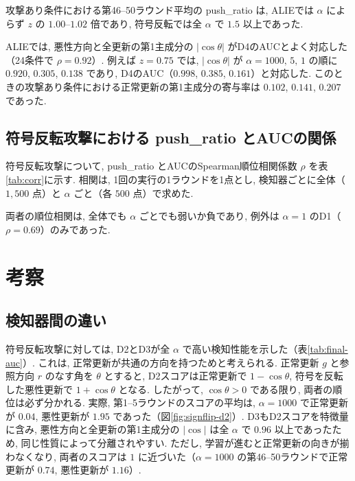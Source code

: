 \documentclass[a4j, dvipdfmx]{jsarticle}
\newcommand{\PushRatio}{\textrm{push\_ratio}}
\begin{document}
攻撃あり条件における第46--50ラウンド平均の \PushRatio{} は, ALIEでは $\alpha$ によらず $z$ の $1.00$--$1.02$ 倍であり, 符号反転では全 $\alpha$ で $1.5$ 以上であった.

ALIEでは, 悪性方向と全更新の第1主成分の $|\cos\theta|$ がD4のAUCとよく対応した（24条件で $\rho=0.92$）. 例えば $z=0.75$ では, $|\cos\theta|$ が $\alpha=1000,\,5,\,1$ の順に $0.920$, $0.305$, $0.138$ であり, D4のAUC（$0.998$, $0.385$, $0.161$）と対応した. このときの攻撃あり条件における正常更新の第1主成分の寄与率は $0.102$, $0.141$, $0.207$ であった.

\subsection{符号反転攻撃における \PushRatio{} とAUCの関係}
\label{sec:res-pushratio}

符号反転攻撃について, \PushRatio{} とAUCのSpearman順位相関係数 $\rho$ を表\ref{tab:corr}に示す. 相関は, 1回の実行の1ラウンドを1点とし, 検知器ごとに全体（$1{,}500$ 点）と $\alpha$ ごと（各 $500$ 点）で求めた.



両者の順位相関は, 全体でも $\alpha$ ごとでも弱いか負であり, 例外は $\alpha=1$ のD1（$\rho=0.69$）のみであった.

\section{考察}
\label{sec:discussion}

\subsection{検知器間の違い}
\label{sec:disc-detectors}

符号反転攻撃に対しては, D2とD3が全 $\alpha$ で高い検知性能を示した（表\ref{tab:final-auc}）. これは, 正常更新が共通の方向を持つためと考えられる. 正常更新 $g$ と参照方向 $r$ のなす角を $\theta$ とすると, D2スコアは正常更新で $1-\cos\theta$, 符号を反転した悪性更新で $1+\cos\theta$ となる. したがって, $\cos\theta>0$ である限り, 両者の順位は必ず分かれる. 実際, 第1--5ラウンドのスコアの平均は, $\alpha=1000$ で正常更新が $0.04$, 悪性更新が $1.95$ であった（図\ref{fig:signflip-d2}）. D3もD2スコアを特徴量に含み, 悪性方向と全更新の第1主成分の $|\cos|$ は全 $\alpha$ で $0.96$ 以上であったため, 同じ性質によって分離されやすい. ただし, 学習が進むと正常更新の向きが揃わなくなり, 両者のスコアは $1$ に近づいた（$\alpha=1000$ の第46--50ラウンドで正常更新が $0.74$, 悪性更新が $1.16$）.
\end{document}
